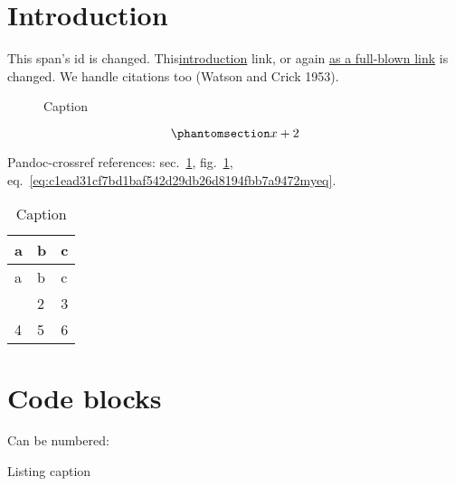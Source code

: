 \section{Introduction}\label{sec:c1ead31cf7bd1baf542d29db26d8194fbb7a9472intro}

\label{61879b5e0ffe4fbb0cb6788aa8462db5f9c333dbref}{This
span's id} is changed.
This\hyperref[sec:c1ead31cf7bd1baf542d29db26d8194fbb7a9472intro]{introduction}
link, or again \hyperref[introduction]{as a full-blown link} is changed.
We handle citations too (Watson and Crick 1953).

\begin{figure}
\centering
{}
\caption{Caption}\label{fig:c1ead31cf7bd1baf542d29db26d8194fbb7a9472image}
\end{figure}

\begin{equation}\phantomsection\label{eq:c1ead31cf7bd1baf542d29db26d8194fbb7a9472myeq}{x + 2}\end{equation}

Pandoc-crossref references:
sec.~\ref{sec:c1ead31cf7bd1baf542d29db26d8194fbb7a9472intro},
fig.~\ref{fig:c1ead31cf7bd1baf542d29db26d8194fbb7a9472image},
eq.~\ref{eq:c1ead31cf7bd1baf542d29db26d8194fbb7a9472myeq}.

\begin{longtable}[]{@{}lll@{}}
\caption{\label{tbl:c1ead31cf7bd1baf542d29db26d8194fbb7a9472label}Caption}\tabularnewline
\toprule\noalign{}
a & b & c \\
\midrule\noalign{}
\endfirsthead
\toprule\noalign{}
a & b & c \\
\midrule\noalign{}
\endhead
\bottomrule\noalign{}
\endlastfoot
1 & 2 & 3 \\
4 & 5 & 6 \\
\end{longtable}

\section{Code
blocks}\label{61879b5e0ffe4fbb0cb6788aa8462db5f9c333dbc1ead31cf7bd1baf542d29db26d8194fbb7a9472code-blocks}

Can be numbered:

\begin{codelisting}

\caption{Listing caption}\label{lst:c1ead31cf7bd1baf542d29db26d8194fbb7a9472numberedcode}

\begin{Shaded}
\begin{Highlighting}[]
 \NormalTok{ ()}
\OtherTok{=}  
\end{Highlighting}
\end{Shaded}

\end{codelisting}

